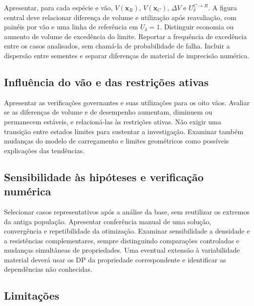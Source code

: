 \begin{fillblock}
Apresentar, para cada espécie e vão, $V(\mathbf{x}_R)$, $V(\mathbf{x}_C)$, $\Delta V$ e $U_\delta^{C\rightarrow R}$. A figura central deve relacionar diferença de volume e utilização após reavaliação, com painéis por vão e uma linha de referência em $U_\delta=1$. Distinguir economia ou aumento de volume de excedência do limite. Reportar a frequência de excedência entre os casos analisados, sem chamá-la de probabilidade de falha. Incluir a dispersão entre sementes e separar diferenças de material de imprecisão numérica.
\end{fillblock}

\subsection{Influência do vão e das restrições ativas}\label{sec:governante}

\begin{fillblock}
Apresentar as verificações governantes e suas utilizações para os oito vãos. Avaliar se as diferenças de volume e de desempenho aumentam, diminuem ou permanecem estáveis, e relacioná-las às restrições ativas. Não exigir uma transição entre estados limites para sustentar a investigação. Examinar também mudanças do modelo de carregamento e limites geométricos como possíveis explicações das tendências.
\end{fillblock}

\subsection{Sensibilidade às hipóteses e verificação numérica}\label{sec:caso_detalhado}

\begin{fillblock}
Selecionar casos representativos após a análise da base, sem reutilizar os extremos da antiga população. Apresentar conferência manual de uma solução, convergência e repetibilidade da otimização. Examinar sensibilidade a densidade e a resistências complementares, sempre distinguindo comparações controladas e mudanças simultâneas de propriedades. Uma eventual extensão à variabilidade material deverá usar os DP da propriedade correspondente e identificar as dependências não conhecidas.
\end{fillblock}

\subsection{Limitações}\label{sec:limitacoes}

